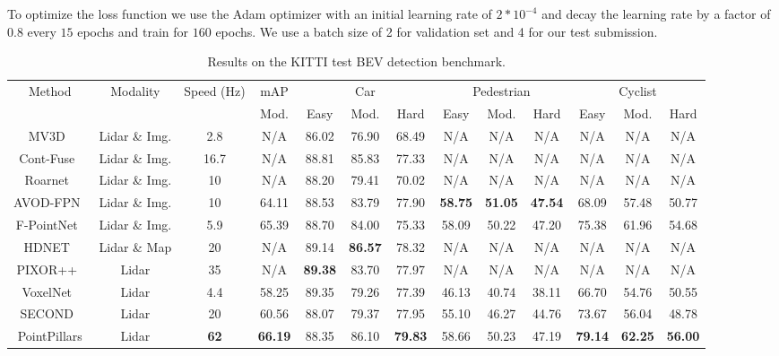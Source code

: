 \documentclass[10pt,twocolumn,letterpaper]{article}
\begin{document}
To optimize the loss function we use the Adam optimizer with an initial learning rate of $2*10^{-4}$ and decay the learning rate by a factor of $0.8$ every $15$ epochs and train for $160$ epochs.
We use a batch size of 2 for validation set and 4 for our test submission. 
\begin{table*}[]
\small
\begin{tabular}{| c | c | c | c || c | c | c || c | c | c || c | c | c |}
\hline
\multirow{2}{*}{Method}				& \multirow{2}{*}{Modality}			& \multirow{2}{10mm}{Speed (Hz)}	& mAP		& \multicolumn{3}{|c||}{Car}		& \multicolumn{3}{|c||}{Pedestrian}		& \multicolumn{3}{|c|}{Cyclist}	\\ \cline{4-13}
					&				& 		& Mod.		& Easy		& Mod.		& Hard		& Easy		& Mod.		& Hard		& Easy		& Mod.		& Hard	\\ \hline 
MV3D~\cite{mv3d}		& Lidar \& Img.	& 2.8		& N/A		& 86.02 		& 76.90 		& 68.49		&  N/A		&  N/A 		&  N/A		&  N/A 		&  N/A 		&  N/A	\\ 
Cont-Fuse~\cite{contfuse}		& Lidar \& Img.	& 16.7			& N/A		& 88.81 		& 85.83 		& 77.33		&  N/A		&  N/A 		&  N/A		&  N/A 		&  N/A 		&  N/A	\\ 
Roarnet~\cite{roarnet}		& Lidar \& Img.	& 10		& N/A		& 88.20 		& 79.41 		& 70.02		&  N/A		&  N/A 		&  N/A		&  N/A 		&  N/A 		&  N/A	\\ 
AVOD-FPN~\cite{avod}	& Lidar \& Img.	& 10		& 64.11		& 88.53		& 83.79 		& 77.90		& \textbf{58.75}	& \textbf{51.05}	& \textbf{47.54}	& 68.09 		& 57.48		& 50.77	\\ 
F-PointNet~\cite{frustum}	&  Lidar \& Img.	& 5.9		& 65.39		& 88.70		& 84.00 		& 75.33		& 58.09		& 50.22		& 47.20		& 75.38		& 61.96		& 54.68	\\ \hline
HDNET~\cite{hdnet}	&  Lidar \& Map	& 20		& N/A		& 89.14		& \textbf{86.57}		& 78.32		& N/A		& N/A		& N/A		& N/A		& N/A		& N/A	\\ \hline
PIXOR++~\cite{hdnet}	& Lidar			& 35			& N/A		& \textbf{89.38} & 83.70 		& 77.97		&  N/A		&  N/A 		&  N/A		&  N/A 		&  N/A 		&  N/A	\\ 
VoxelNet~\cite{voxelnet}	& Lidar			& 4.4		& 58.25		& 89.35	& 79.26 		& 77.39		& 46.13		& 40.74		& 38.11		& 66.70		& 54.76		& 50.55	\\
SECOND~\cite{second}	& Lidar			& 20			& 60.56		& 88.07 		& 79.37 		& 77.95		& 55.10 		& 46.27		& 44.76		& 73.67		& 56.04		& 48.78	\\ \hline
PointPillars			& Lidar			& \textbf{62}	& \textbf{66.19}	& 88.35		& 86.10	& \textbf{79.83}	& 58.66		& 50.23		& 47.19		& \textbf{79.14} & \textbf{62.25} & \textbf{56.00} \\ \hline
\end{tabular}
\caption{Results on the KITTI test BEV detection benchmark.}
\label{table:res_bev}
\end{table*}
\end{document}
